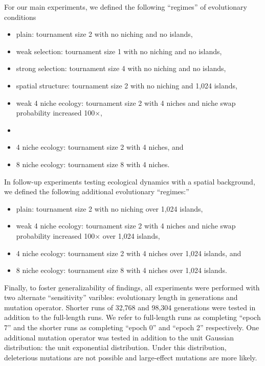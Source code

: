 For our main experiments, we defined the following ``regimes'' of evolutionary conditions
\begin{itemize}
    \item plain: tournament size 2 with no niching and no islands,
    \item weak selection: tournament size 1 with no niching and no islands,
    \item strong selection: tournament size 4 with no niching and no islands,
    \item spatial structure: tournament size 2 with no niching and 1,024 islands,
    \item weak 4 niche ecology: tournament size 2 with 4 niches and niche swap probability increased 100$\times$,\item  \item 4 niche ecology: tournament size 2 with 4 niches, and
    \item 8 niche ecology: tournament size 8 with 4 niches.
\end{itemize}

In follow-up experiments testing ecological dynamics with a spatial background, we defined the following additional evolutionary ``regimes:''
\begin{itemize}
    \item plain: tournament size 2 with no niching over 1,024 islands,
    \item weak 4 niche ecology: tournament size 2 with 4 niches and niche swap probability increased 100$\times$ over 1,024 islands,    
    \item 4 niche ecology: tournament size 2 with 4 niches over 1,024 islands, and
    \item 8 niche ecology: tournament size 8 with 4 niches over 1,024 islands.
\end{itemize}

Finally, to foster generalizability of findings, all experiments were performed with two alternate ``sensitivity'' varibles: evolutionary length in generations and mutation operator.
Shorter runs of 32,768 and 98,304 generations were tested in addition to the full-length runs. 
We refer to full-length runs as completing ``epoch 7'' and the shorter runs as completing ``epoch 0'' and ``epoch 2'' respectively.
One additional mutation operator was tested in addition to the unit Gaussian distribution: the unit exponential distribution.
Under this distribution, deleterious mutations are not possible and large-effect mutations are more likely.

